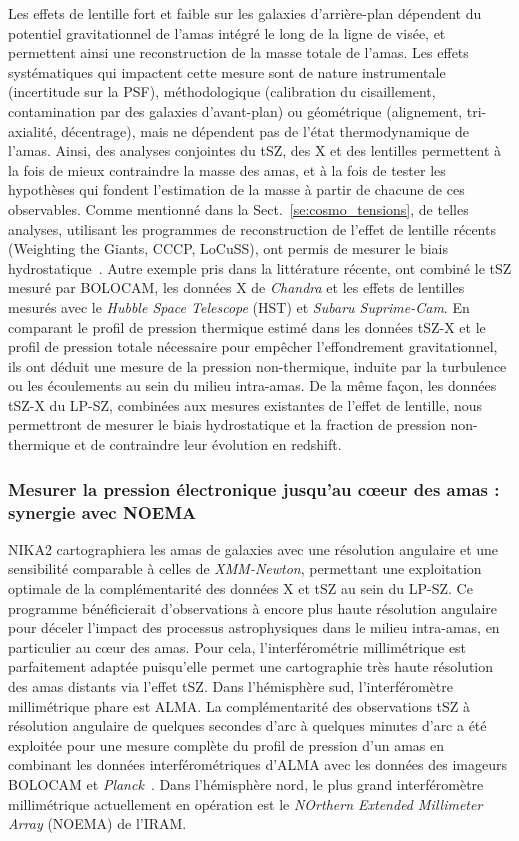 Les effets de lentille fort et faible sur les galaxies d'arrière-plan
dépendent du potentiel gravitationnel de l'amas intégré le long de la
ligne de visée, et permettent ainsi une reconstruction de la masse
totale de l'amas. Les effets systématiques qui impactent cette mesure
sont de nature instrumentale (incertitude sur la PSF), méthodologique
(calibration du cisaillement, contamination par des galaxies
d'avant-plan) ou géométrique (alignement, tri-axialité, décentrage),
mais ne dépendent pas de l'état thermodynamique de l'amas. Ainsi, des
analyses conjointes du tSZ, des X et des lentilles
permettent à la fois de mieux contraindre la masse des amas, et à la
fois de tester les hypothèses qui fondent l'estimation de la masse à
partir de chacune de ces observables. Comme mentionné dans la
Sect.~\ref{se:cosmo_tensions}, de telles analyses, utilisant les
programmes de reconstruction de l'effet de lentille récents (Weighting
the Giants, CCCP, LoCuSS), ont permis de mesurer le biais
hydrostatique~\citep[voir][pour une compilation des
  résultats]{Salvati2018, Osato2019}. Autre exemple pris dans la littérature
récente, \citet{Siegel2018} ont combiné le tSZ mesuré par BOLOCAM, les
données X de \emph{Chandra} et les effets de lentilles mesurés avec le
\emph{Hubble Space Telescope} (HST) et \emph{Subaru Suprime-Cam}. En
comparant le profil de pression thermique estimé dans les données
tSZ-X et le profil de pression totale nécessaire pour empêcher
l'effondrement gravitationnel, ils ont déduit une mesure de la pression
non-thermique, induite par la turbulence ou les écoulements au sein du
milieu intra-amas. De la même façon, les données tSZ-X du LP-SZ,
combinées aux mesures existantes de l'effet de lentille, nous
permettront de mesurer le biais hydrostatique et la fraction de pression
non-thermique et de contraindre leur évolution en redshift.  

\subsubsection{Mesurer la pression électronique jusqu'au c\oe eur des
  amas : synergie avec NOEMA}

NIKA2 cartographiera les amas de galaxies avec une résolution angulaire
et une sensibilité comparable à celles de \emph{XMM-Newton},
permettant une exploitation optimale de la complémentarité des données
X et tSZ au sein du LP-SZ. Ce programme bénéficierait d'observations à
encore plus haute résolution angulaire pour déceler l'impact des
processus astrophysiques dans le milieu intra-amas, en particulier au
c\oe ur des amas. Pour cela, l'interférométrie millimétrique est
parfaitement adaptée puisqu'elle permet une cartographie très haute
résolution des amas distants via l'effet tSZ. Dans l'hémisphère sud,
l'interféromètre millimétrique phare est ALMA. La complémentarité des
observations tSZ à résolution angulaire de quelques secondes d'arc à
quelques minutes d'arc a été exploitée pour une mesure complète du
profil de pression d'un amas en combinant les données
interférométriques d'ALMA avec les données des imageurs BOLOCAM et
\emph{Planck}~\citep{DiMascolo2019}. Dans l'hémisphère nord, le plus
grand interféromètre millimétrique actuellement en opération est le
\emph{NOrthern Extended Millimeter Array} (NOEMA) de l'IRAM.

